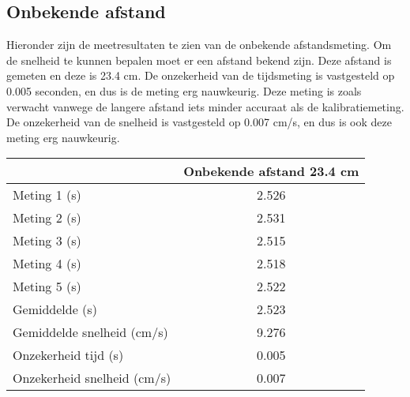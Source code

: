 \documentclass[12pt]{book}
\begin{document}
\subsection*{Onbekende afstand}
Hieronder zijn de meetresultaten te zien van de onbekende afstandsmeting. Om de snelheid te kunnen bepalen moet er een afstand bekend zijn. Deze afstand is gemeten en deze is 23.4 cm. De onzekerheid van de tijdsmeting is vastgesteld op 0.005 seconden, en dus is de meting erg nauwkeurig. Deze meting is zoals verwacht vanwege de langere afstand iets minder accuraat als de kalibratiemeting. De onzekerheid van de snelheid is vastgesteld op 0.007 cm/s, en dus is ook deze meting erg nauwkeurig.
\begin{center}
\begin{tabular}{| l| c|}
\hline
    & Onbekende afstand 23.4 cm\\
\hline
   Meting 1 (s) & 2.526 \\
\hline
   Meting 2 (s) & 2.531 \\
\hline
   Meting 3 (s) & 2.515 \\
\hline
   Meting 4 (s) & 2.518 \\
\hline
   Meting 5 (s) & 2.522 \\
\hline
   Gemiddelde (s) & 2.523 \\
\hline
   Gemiddelde snelheid (cm/s) & 9.276 \\
\hline
   Onzekerheid tijd (s) & 0.005 \\
\hline
   Onzekerheid snelheid (cm/s) & 0.007 \\
\hline
 \end{tabular}
\end{center}
\end{document}
